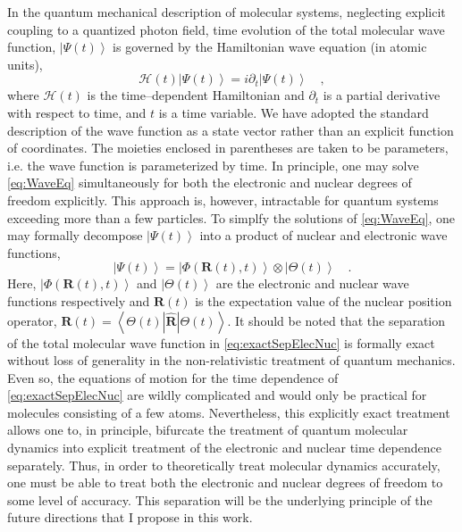 \documentclass[12pt]{article}
\newcommand{\ket}[1]{\left\vert #1 \right\rangle}         %
\newcommand{\innerop}[3]{\left\langle #1 \left\vert #2 \right\vert #3 \right\rangle}  %
\newcommand*\vc[1]{\boldsymbol{#1}}
\begin{document}
In the quantum mechanical description of molecular systems, neglecting explicit
coupling to a quantized photon field, time evolution of the total molecular wave
function, $\ket{\Psi (t)}$ is governed by the Hamiltonian wave equation 
(in atomic units),
\begin{equation}
\mathscr{H}(t) \ket{\Psi (t)} = i\partial_t \ket{\Psi(t)} \quad,
\label{eq:WaveEq}
\end{equation}
where $\mathscr{H}(t)$ is the time--dependent Hamiltonian and $\partial_t$ is a
partial derivative with respect to time, and $t$ is a time variable. We have
adopted the standard description of the wave function as a state vector rather
than an explicit function of coordinates. The moieties enclosed in parentheses
are taken to be parameters, i.e. the wave function is parameterized by time.
In principle, one may solve \cref{eq:WaveEq} simultaneously for both the 
electronic and nuclear degrees of freedom explicitly. This approach is, however,
intractable for quantum systems exceeding more than a few particles. To simplfy
the solutions of \cref{eq:WaveEq}, one may formally decompose $\ket{\Psi (t)}$
into a product of nuclear and electronic wave functions,
\begin{equation} 
\ket{\Psi (t)} = \ket{\Phi(\vc{R}(t),t)}\otimes\ket{\Theta(t)} 
\quad .  
\label{eq:exactSepElecNuc}
\end{equation} 
Here, $\ket{\Phi(\vc{R}(t),t)}$ and $\ket{\Theta (t)}$ are the electronic and
nuclear wave functions respectively and $\vc{R}(t)$ is the expectation value of
the nuclear position operator, $\vc{R}(t) =
\innerop{\Theta(t)}{\hat{\vc{R}}}{\Theta(t)}$.  It should be noted that the
separation of the total molecular wave function in \cref{eq:exactSepElecNuc} is
formally exact\cite{Gross10_PRL123002, Cederbaum08_JCP124101} without loss of
generality in the non-relativistic treatment of quantum mechanics. Even so, the
equations of motion for the time dependence of \cref{eq:exactSepElecNuc} are
wildly complicated\cite{Ghosh15_MP1} and would only be practical for molecules
consisting of a few atoms.  Nevertheless, this explicitly exact treatment allows
one to, in principle, bifurcate the treatment of quantum molecular dynamics into
explicit treatment of the electronic and nuclear time dependence separately.
Thus, in order to theoretically treat molecular dynamics accurately, one must be
able to treat both the electronic and nuclear degrees of freedom to some level
of accuracy.  This separation will be the underlying principle of the future
directions that I propose in this work.
\end{document}
